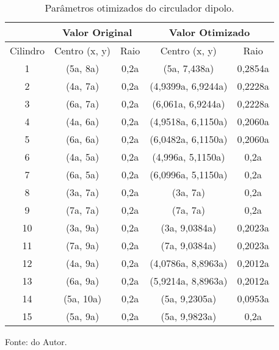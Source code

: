 



\begin{table}[H]
    \centering
    \caption{Parâmetros otimizados do circulador dipolo.}
\begin{tabular}{ccccc}
\hline
         & \multicolumn{2}{c}{Valor Original} & \multicolumn{2}{c}{Valor Otimizado}              \\ \hline
Cilindro & Centro (x, y)        & Raio        & Centro (x, y)      & Raio                        \\ \hline
1        & (5a, 8a)             & 0,2a        & (5a, 7,438a)       & \multicolumn{1}{l}{0,2854a} \\
2        & (4a, 7a)             & 0,2a        & (4,9399a, 6,9244a) & \multicolumn{1}{l}{0,2228a} \\
3        & (6a, 7a)             & 0,2a        & (6,061a, 6,9244a)  & 0,2228a                     \\
4        & (4a, 6a)             & 0,2a        & (4,9518a, 6,1150a) & 0,2060a                     \\
5        & (6a, 6a)             & 0,2a        & (6,0482a, 6,1150a) & 0,2060a                     \\
6        & (4a, 5a)             & 0,2a        & (4,996a, 5,1150a)  & 0,2a                        \\
7        & (6a, 5a)             & 0,2a        & (6,0996a, 5,1150a) & 0,2a                        \\
8        & (3a, 7a)             & 0,2a        & (3a, 7a)           & 0,2a                        \\
9        & (7a, 7a)             & 0,2a        & (7a, 7a)           & 0,2a                        \\
10       & (3a, 9a)             & 0,2a        & (3a, 9,0384a)      & 0,2023a                     \\
11       & (7a, 9a)             & 0,2a        & (7a, 9,0384a)      & 0,2023a                     \\
12       & (4a, 9a)             & 0,2a        & (4,0786a, 8,8963a) & 0,2012a                     \\
13       & (6a, 9a)             & 0,2a        & (5,9214a, 8,8963a) & 0,2012a                     \\
14       & (5a, 10a)            & 0,2a        & (5a, 9,2305a)      & 0,0953a                     \\
15       & (5a, 9a)             & 0,2a        & (5a, 9,9823a)      & 0,2a                        \\ \hline
\end{tabular}

    \label{tab: DipoloOtimizado}

    \vspace{2.5mm}
    Fonte: do Autor.

\end{table}